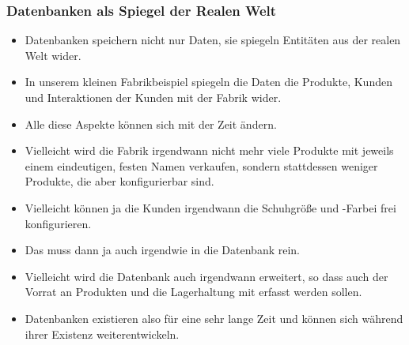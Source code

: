 \documentclass[aspectratio=169,mathserif,notheorems]{beamer}%
\begin{document}
%
\begin{frame}%
\frametitle{Datenbanken als Spiegel der Realen Welt}%
%
\begin{itemize}%
\item Datenbanken speichern nicht nur Daten, sie spiegeln Entitäten aus der realen Welt wider.%
%
\item<2-> In unserem kleinen Fabrikbeispiel spiegeln die Daten die Produkte, Kunden und Interaktionen der Kunden mit der Fabrik wider.%
%
\item<3-> Alle diese Aspekte können sich mit der Zeit ändern.%
%
\item<4-> Vielleicht wird die Fabrik irgendwann nicht mehr viele Produkte mit jeweils einem eindeutigen, festen Namen verkaufen, sondern stattdessen weniger Produkte, die aber konfigurierbar sind.%
%
\item<5-> Vielleicht können ja die Kunden irgendwann die Schuhgröße und -Farbei frei konfigurieren.%
%
\item<6-> Das muss dann ja auch irgendwie in die Datenbank rein.%
%
\item<7-> Vielleicht wird die Datenbank auch irgendwann erweitert, so dass auch der Vorrat an Produkten und die Lagerhaltung mit erfasst werden sollen.%
%
\item<8-> Datenbanken existieren also für eine sehr lange Zeit und können sich während ihrer Existenz weiterentwickeln.%
%
\end{itemize}%
\end{frame}%
%
\end{document}
